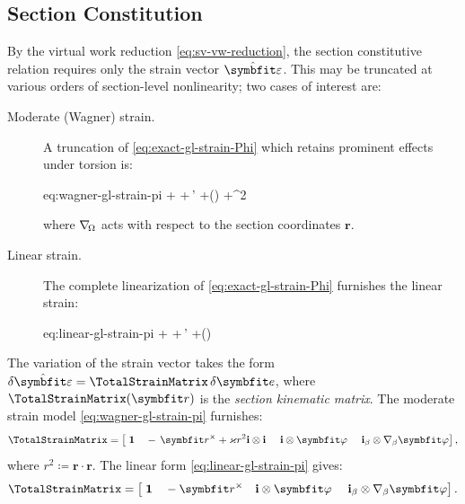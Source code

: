 \subsection{Section Constitution}\label{sec:std-section}

By the virtual work reduction \eqref{eq:sv-vw-reduction}, the section constitutive 
relation requires only the strain vector \(\hat{\StrainVector}\). 
This may be truncated at various 
orders of section-level nonlinearity; two cases of interest are:

\begin{description}
\item[Moderate (Wagner) strain.]
A truncation of \eqref{eq:exact-gl-strain-Phi} which retains prominent effects under torsion is:
\begin{SaveEquation}{eq:wagner-gl-strain-pi}
%
\hat{\StrainVector}\coloneq
\bm{\gamma}
+\bm{\kappa}\times{}
+\FrameBasis\otimes\WarpAxialShapes\,\bm{\alpha}'
+\gradS (\WarpAxialShapes\cdot\bm{\alpha})
+\Twist^2\,
\cdot{}\,\FrameBasis
\end{SaveEquation}
where \(\nabla_{\!\Omega}\) acts with respect to the section coordinates \(\bm{r}\). 

\item[Linear strain.]
The complete linearization of \eqref{eq:exact-gl-strain-Phi} furnishes the linear strain:
\begin{SaveEquation}{eq:linear-gl-strain-pi}
\hat{\StrainVector}\coloneq
\bm{\gamma}
+\bm{\kappa}\times{}
+\FrameBasis\otimes\WarpAxialShapes\,\bm{\alpha}'
+\gradS (\WarpAxialShapes\cdot\bm{\alpha})
\end{SaveEquation}
\end{description}

The variation of the strain vector takes the form 
\(\delta\hat{\bm{\varepsilon}} = \TotalStrainMatrix\,\delta\bm{e}\),
where \(\TotalStrainMatrix(\bm{r})\) is the \emph{section kinematic matrix}. 
The moderate strain model \eqref{eq:wagner-gl-strain-pi} furnishes:
\begin{equation}
\TotalStrainMatrix
=\left[
\;\mathbf{1}
~~~-\,\bm{r}^{\times}+\Twist r^2 \FrameBasis\otimes\FrameBasis
~~~~\FrameBasis\otimes\WarpAxialShapes
~~~~\FrameBasis_{\beta}\otimes\nabla_{\beta}\WarpAxialShapes
\right],
\label{eq:def-section-kinematic-matrix-wagner}
\end{equation}
where \(r^2 \coloneq \bm{r}\cdot\bm{r}\).
The linear form \eqref{eq:linear-gl-strain-pi} gives:
\begin{equation}
\TotalStrainMatrix
=\left[
\;\mathbf{1}
~~~-\bm{r}^{\times}
~~~\FrameBasis\otimes\WarpAxialShapes
~~~~\FrameBasis_{\beta}\otimes\nabla_{\beta}\WarpAxialShapes
\right].
\label{eq:def-section-kinematic-matrix-Phi}
\end{equation}

